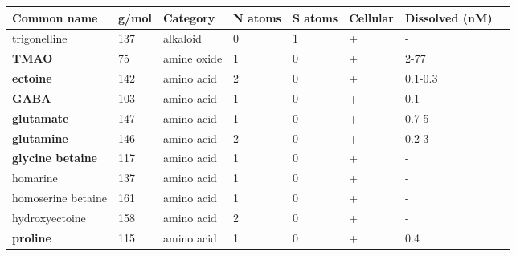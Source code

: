 \documentclass[utf8]{frontiersSCNS} %
\begin{document}
\bgroup
\def\arraystretch{1.5}%
\begin{landscape}
\begin{table}[]
\begin{tabular}{llllllll}
\textbf{Common name} & \textbf{g/mol} & \textbf{Category} & \textbf{N atoms} & \textbf{S atoms} & \textbf{Cellular} & \textbf{Dissolved (nM)} & \\ \hline
trigonelline         & 137            & alkaloid          & 0                & 1                & +                 & -                                   \\
\textbf{TMAO}                 & 75             & amine oxide       & 1                & 0                & +                 & 2-77 \citep{Hatton1999,Gibb2004}     \\
\textbf{ectoine}              & 142            & amino acid        & 2                & 0                & +                 & 0.1-0.3 \citep{Widner2021}              \\
\textbf{GABA}                 & 103            & amino acid        & 1                & 0                & +                 & 0.1 \citep{Widner2021}              \\
\textbf{glutamate}            & 147            & amino acid        & 1                & 0                & +                 & 0.7-5 \citep{Widner2021,Mopper1982}   \\
\textbf{glutamine}            & 146            & amino acid        & 2                & 0                & +                 & 0.2-3 \citep{Widner2021,Mopper1982}   \\
\textbf{glycine betaine}      & 117            & amino acid        & 1                & 0                & +                 & -                                       \\
homarine             & 137            & amino acid        & 1                & 0                & +                 & -                                      \\
homoserine betaine   & 161            & amino acid        & 1                & 0                & +                 & -                                       \\
hydroxyectoine       & 158            & amino acid        & 2                & 0                & +                 & -                                        \\
\textbf{proline}              & 115            & amino acid        & 1                & 0                & +                 & 0.4 \citep{Widner2021}              \\

\end{tabular}
\end{table}
\end{landscape}
\end{document}
